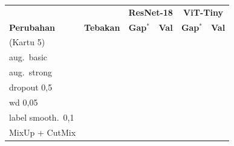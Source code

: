 \documentclass[t,aspectratio=169,xcolor={dvipsnames,table}]{beamer}
\begin{document}
\begin{frame}
\begin{columns}[T]
        \vspace{2pt}
        \scriptsize
        \setlength{\tabcolsep}{4pt}
        \renewcommand{\arraystretch}{1.3}
        \begin{tabular}{|l|c|c|c|c|c|}
            \rowcolor{dlSoftCloud} & & \multicolumn{2}{c|}{\textbf{ResNet-18}} & \multicolumn{2}{c|}{\textbf{ViT-Tiny}} \\
            \rowcolor{dlSoftCloud} \textbf{Perubahan} & \textbf{Tebakan} & \textbf{Gap$^{*}$} & \textbf{Val} & \textbf{Gap$^{*}$} & \textbf{Val} \\ \hline
            (Kartu 5) & \hspace{0.6cm} & \hspace{0.6cm} & \hspace{0.6cm} & \hspace{0.6cm} & \hspace{0.6cm} \\ \hline
            aug.\ basic & \hspace{0.6cm} & \hspace{0.6cm} & \hspace{0.6cm} & \hspace{0.6cm} & \hspace{0.6cm} \\ \hline
            aug.\ strong & \hspace{0.6cm} & \hspace{0.6cm} & \hspace{0.6cm} & \hspace{0.6cm} & \hspace{0.6cm} \\ \hline
            dropout 0,5 & \hspace{0.6cm} & \hspace{0.6cm} & \hspace{0.6cm} & \hspace{0.6cm} & \hspace{0.6cm} \\ \hline
            wd 0,05 & \hspace{0.6cm} & \hspace{0.6cm} & \hspace{0.6cm} & \hspace{0.6cm} & \hspace{0.6cm} \\ \hline
            label smooth.\ 0,1 & \hspace{0.6cm} & \hspace{0.6cm} & \hspace{0.6cm} & \hspace{0.6cm} & \hspace{0.6cm} \\ \hline
            MixUp + CutMix & \hspace{0.6cm} & \hspace{0.6cm} & \hspace{0.6cm} & \hspace{0.6cm} & \hspace{0.6cm} \\ \hline
        \end{tabular}


\end{columns}
\end{frame}
\end{document}
